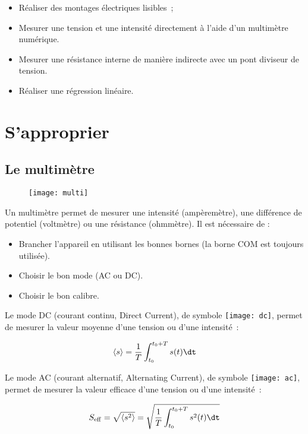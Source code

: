 \documentclass[../main/main.tex]{subfiles}
\begin{document}
\begin{itemize}
	\item Réaliser des montages électriques lisibles~;
	\item Mesurer une tension et une intensité directement à l’aide d’un
	      multimètre numérique.
	\item Mesurer une résistance interne de manière indirecte avec un pont
	      diviseur de tension.
	\item Réaliser une régression linéaire.
\end{itemize}

\section{S'approprier}
\subsection{Le multimètre}

\begin{wrapfigure}[20]{R}{.3\linewidth}
	\vspace*{-20pt}
	\centering
	\texttt{[image: multi]}
\end{wrapfigure}
Un multimètre permet de mesurer une intensité (ampèremètre), une différence de
potentiel (voltmètre) ou une résistance (ohmmètre). Il est nécessaire de :
\begin{itemize}
	\item Brancher l’appareil en utilisant les bonnes bornes (la borne COM est
	      toujours utilisée).
	\item Choisir le bon mode (AC ou DC).
	\item Choisir le bon calibre.
\end{itemize}


Le mode DC (courant continu, Direct Current), de symbole
\texttt{[image: dc]}, permet de mesurer la valeur moyenne d’une
tension ou d’une intensité~:

\begin{equation*}
	\left\langle s \right\rangle = \frac{1}{T} \int_{t_0}^{t_0+T} s(t) \dt
\end{equation*}

Le mode AC (courant alternatif, Alternating Current), de symbole
\texttt{[image: ac]}, permet de mesurer la valeur efficace d’une
tension ou d’une intensité~:

\begin{equation*}
	S_{\rm eff} = \sqrt{ \left\langle s^2 \right\rangle} = \sqrt{\frac{1}{T}
		\int_{t_0}^{t_0+T} s^2(t) \dt}
\end{equation*}
\end{document}
